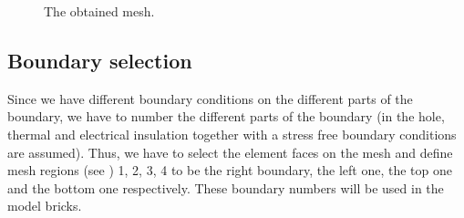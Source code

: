 \documentclass[a4paper,11pt,english]{sphinxmanual}
\begin{document}
\begin{figure}[htbp]
\centering
\capstart

\noindent{}
\caption{The obtained mesh.}\label{\detokenize{tutorial/thermo_coupling:id3}}\label{\detokenize{tutorial/thermo_coupling:tut-fig-meshthermo}}\end{figure}

\clearpage


\subsection{Boundary selection}
\label{\detokenize{tutorial/thermo_coupling:boundary-selection}}
\sphinxAtStartPar
Since we have different boundary conditions on the different parts of the boundary, we have to number the different parts of the boundary (in the hole, thermal and electrical insulation together with a stress free boundary conditions are assumed). Thus, we have to select the element faces on the mesh and define mesh regions (see ) 1, 2, 3, 4 to be the right boundary, the left one, the top one and the bottom one respectively. These boundary numbers will be used in the model bricks.
\end{document}
